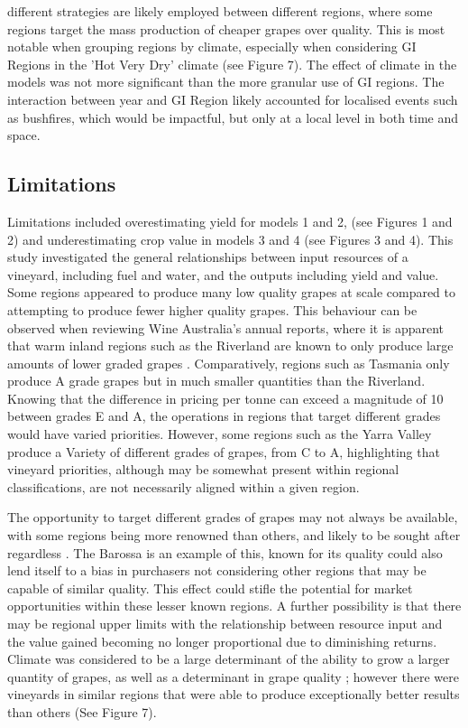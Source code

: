 \documentclass[review,12pt,authoryear]{elsarticle}
\begin{document}
\begin{linenumbers}
different strategies are likely employed between different regions, where some regions target the mass production of cheaper grapes over quality. This is most notable when grouping regions by climate, especially when considering GI Regions in the 'Hot Very Dry' climate (see Figure 7). The effect of climate in the models was not more significant than the more granular use of GI regions. The interaction between year and GI Region likely accounted for localised events such as bushfires, which would be impactful, but only at a local level in both time and space.

\subsection{Limitations}
Limitations included overestimating yield for models 1 and 2, (see Figures 1 and 2) and underestimating crop value in models 3 and 4 (see Figures 3 and 4).
This study investigated the general relationships between input resources of a vineyard, including fuel and water, and the outputs including yield and value. Some regions appeared to produce many low quality grapes at scale compared to attempting to produce fewer higher quality grapes. This behaviour can be observed when reviewing Wine Australia's annual reports, where it is apparent that warm inland regions such as the Riverland are known to only produce large amounts of lower graded grapes \cite{wineaustraliaNationalVintageReport2022,winemakersfederationofaustraliaNationalVintageReport2017}. Comparatively, regions such as Tasmania only produce A grade grapes but in much smaller quantities than the Riverland. Knowing that the difference in pricing per tonne can exceed a magnitude of 10 between grades E and A, the operations in regions that target different grades would have varied priorities. However, some regions such as the Yarra Valley produce a Variety of different grades of grapes, from C to A, highlighting that vineyard priorities, although may be somewhat present within regional classifications, are not necessarily aligned within a given region. 

The opportunity to target different grades of grapes may not always be available, with some regions being more renowned than others, and likely to be sought after regardless \citep{hallidayAustralianWineEncyclopedia2009}. The Barossa is an example of this, known for its quality could also lend itself to a bias in purchasers not considering other regions that may be capable of similar quality. This effect could stifle the potential for market opportunities within these lesser known regions. A further possibility is that there may be regional upper limits with the relationship between resource input and the value gained becoming no longer proportional due to diminishing returns. Climate was considered to be a large determinant of the ability to grow a larger quantity of grapes, as well as a determinant in grape quality \citep{agostaRegionalClimateVariability2012}; however there were vineyards in similar regions that were able to produce exceptionally better results than others (See Figure 7).


\end{linenumbers}
\end{document}
